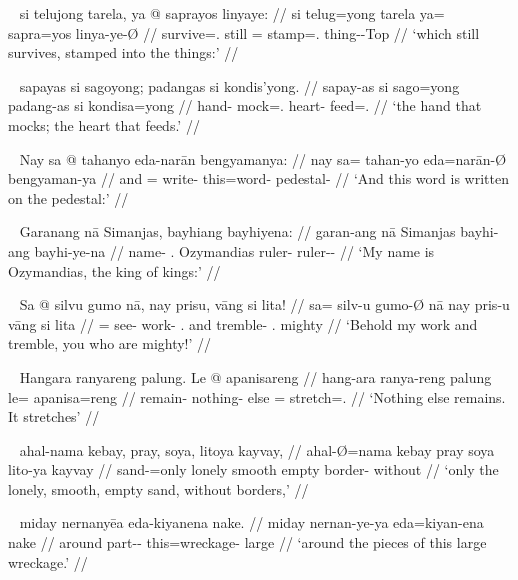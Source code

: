 \ex~\begingl
	\gla si telujong tarela, ya @ saprayos linyaye: //
	\glb si telug=yong tarela ya= sapra=yos linya-ye-Ø //
	\glc \Rel{} survive=\TsgN{}.\Aarg{} still \LocT{}= stamp=\TsgN{}.\Parg{} 
		thing-\Pl{}-Top{} //
	\glft `which still survives, stamped into the things:' //
\endgl\xe

\ex~\begingl
	\gla sapayas si sagoyong; padangas si kondis'yong. //
	\glb sapay-as si sago=yong padang-as si kondisa=yong //
	\glc hand-\Parg{} \Rel{} mock=\TsgN{}.\Aarg{} heart-\Parg{} \Rel{} 
		feed=\TsgN{}.\Aarg{} //
	\glft `the hand that mocks; the heart that feeds.' //
\endgl\xe

\ex~\begingl
	\gla Nay sa @ tahanyo eda-narān bengyamanya: //
	\glb nay sa= tahan-yo eda=narān-Ø bengyaman-ya //
	\glc and \PatT{}= write-\TsgN{} this=word-\Top{} pedestal-\Loc{} //
	\glft `And this word is written on the pedestal:' //
\endgl\xe

\ex~\begingl
	\gla Garanang nā Simanjas, bayhiang bayhiyena: //
	\glb garan-ang nā Simanjas bayhi-ang bayhi-ye-na //
	\glc name-\Aarg{} \Fsg{}.\Gen{} Ozymandias ruler-\Aarg{} 
			ruler-\Pl{}-\Gen{} //
	\glft `My name is Ozymandias, the king of kings:' //
\endgl\xe

\ex~\begingl
	\gla Sa @ silvu gumo nā, nay prisu, vāng si lita! //
	\glb sa= silv-u gumo-Ø nā nay pris-u vāng si lita //
	\glc \PatT{}= see-\Imp{} work-\Top{} \Fsg{}.\Gen{} and tremble-\Imp{}
		\Second{}.\Aarg{} \Rel{} mighty //
	\glft `Behold my work and tremble, you who are mighty!' //
\endgl\xe

\ex~\begingl
	\gla Hangara ranyareng palung. Le @ apanisareng //
	\glb hang-ara ranya-reng palung le= apanisa=reng //
	\glc remain-\TsgI{} nothing-\AargI{} else \PatTI{}= 
		stretch=\TsgI{}.\Aarg{} //
	\glft `Nothing else remains. It stretches' //
\endgl\xe

\ex~\begingl
	\gla ahal-nama kebay, pray, soya, litoya kayvay, //
	\glb ahal-Ø=nama kebay pray soya lito-ya kayvay //
	\glc sand-\Top{}=only lonely smooth empty border-\Loc{} without //
	\glft `only the lonely, smooth, empty sand, without borders,' //
\endgl\xe

\ex~\begingl
	\gla miday nernanyēa eda-kiyanena nake. //
	\glb miday nernan-ye-ya eda=kiyan-ena nake //
	\glc around part-\Pl{}-\Loc{} this=wreckage-\Gen{} large //
	\glft `around the pieces of this large wreckage.' //
\endgl\xe

